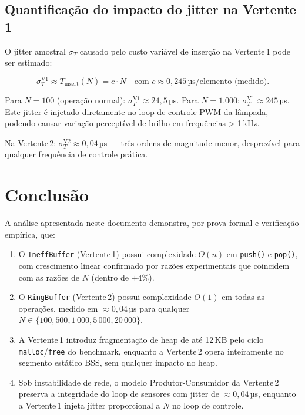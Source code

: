\documentclass[12pt, a4paper]{article}
\theoremstyle{definition}
\theoremstyle{remark}
\begin{document}
\subsection{Quantificação do impacto do jitter na Vertente 1}

O jitter amostral $\sigma_T$ causado pelo custo variável de inserção na
Vertente\,1 pode ser estimado:

\[
  \sigma_T^{\text{V1}} \approx T_{\text{insert}}(N) = c \cdot N
  \quad \text{com } c \approx 0{,}245\,\text{µs/elemento (medido)}.
\]

Para $N = 100$ (operação normal): $\sigma_T^{\text{V1}} \approx 24{,}5$\,µs.
Para $N = 1.000$: $\sigma_T^{\text{V1}} \approx 245$\,µs. Este jitter é
injetado diretamente no loop de controle PWM da lâmpada, podendo causar
variação perceptível de brilho em frequências > 1\,kHz.

Na Vertente\,2: $\sigma_T^{\text{V2}} \approx 0{,}04$\,µs — três ordens de
magnitude menor, desprezível para qualquer frequência de controle prática.

\section{Conclusão}

A análise apresentada neste documento demonstra, por prova formal e
verificação empírica, que:

\begin{enumerate}
  \item O \texttt{IneffBuffer} (Vertente\,1) possui complexidade
    $\Theta(n)$ em \texttt{push()} e \texttt{pop()}, com crescimento linear
    confirmado por razões experimentais que coincidem com as razões de $N$
    (dentro de $\pm 4\%$).

  \item O \texttt{RingBuffer} (Vertente\,2) possui complexidade $O(1)$ em
    todas as operações, medido em $\approx 0{,}04$\,µs para qualquer
    $N \in \{100, 500, 1\,000, 5\,000, 20\,000\}$.

  \item A Vertente\,1 introduz fragmentação de heap de até 12\,KB pelo
    ciclo \texttt{malloc}/\texttt{free} do benchmark, enquanto a Vertente\,2
    opera inteiramente no segmento estático BSS, sem qualquer impacto no
    heap.

  \item Sob instabilidade de rede, o modelo Produtor-Consumidor da
    Vertente\,2 preserva a integridade do loop de sensores com jitter de
    $\approx 0{,}04$\,µs, enquanto a Vertente\,1 injeta jitter proporcional
    a $N$ no loop de controle.
\end{enumerate}
\end{document}
